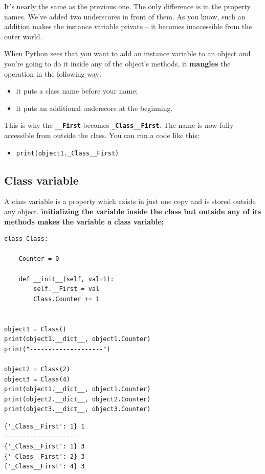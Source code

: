 \documentclass[11pt]{article}
\begin{document}
It’s nearly the same as the previous one. The only difference is in
the property names. We’ve added two underscores in front of them. As
you know, such an addition makes the instance variable private – it
becomes inaccessible from the outer world.

When Python sees that you want to add an instance variable to an
object and you’re going to do it inside any of the object’s methods,
it \textbf{mangles} the operation in the following way:
\begin{itemize}
\item it puts a class name before your name;
\item it puts an additional underscore at the beginning.
\end{itemize}

This is why the \textbf{\texttt{\_\_First}} becomes \textbf{\texttt{\_Class\_\_First}}. The name is now fully
accessible from outside the class. You can run a code like this:
\begin{itemize}
\item \texttt{print(object1.\_Class\_\_First)}

\newpage
\end{itemize}

\subsection{Class variable}
\label{sec:org6a1312e}
A class variable is a property which exists in just one copy and is
stored outside any object. \textbf{initializing the variable inside the class
but outside any of its methods makes the variable a class variable;}

\begin{verbatim}
class Class:

	Counter = 0

	def __init__(self, val=1):
		self.__First = val
		Class.Counter += 1


object1 = Class()
print(object1.__dict__, object1.Counter)
print("--------------------")

object2 = Class(2)
object3 = Class(4)
print(object1.__dict__, object1.Counter)
print(object2.__dict__, object2.Counter)
print(object3.__dict__, object3.Counter)

\end{verbatim}

\begin{verbatim}
{'_Class__First': 1} 1
--------------------
{'_Class__First': 1} 3
{'_Class__First': 2} 3
{'_Class__First': 4} 3
\end{verbatim}
\end{document}
